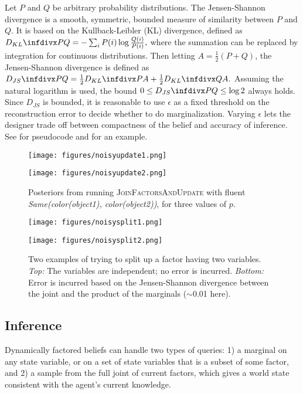 Let $P$ and $Q$ be arbitrary probability distributions. The
Jensen-Shannon divergence is a smooth, symmetric, bounded measure of
similarity between $P$ and $Q$. It is based on the Kullback-Leibler
(KL) divergence, defined as
$\kl{P}{Q} = -\sum_{i}P(i) \log \frac{Q(i)}{P(i)},$ where the
summation can be replaced by integration for continuous
distributions. Then letting $A = \frac{1}{2}(P+Q)$, the Jensen-Shannon
divergence is defined as
$\js{P}{Q} = \frac{1}{2} \kl{P}{A} + \frac{1}{2} \kl {Q}{A}.$ Assuming
the natural logarithm is used, the bound
$0 \leq \js{P}{Q} \leq \log 2$ always holds. Since $D_{JS}$ is
bounded, it is reasonable to use $\epsilon$ as a fixed threshold on
the reconstruction error to decide whether to do
marginalization. Varying $\epsilon$ lets the designer trade off
between compactness of the belief and accuracy of inference. See
 for pseudocode and  for
an example.

\begin{figure}[t]
  \vspace{0.6em}
  \centering
    \noindent
    \texttt{[image: figures/noisyupdate1.png]}

    \vspace{0.7em}

    \texttt{[image: figures/noisyupdate2.png]}
    \caption{Posteriors from running \textsc{JoinFactorsAndUpdate}
      with fluent \emph{Same(color(object1), color(object2))}, for
      three values of $p$.}
  \label{fig:joinfactorsandupdate}
\end{figure}

\begin{figure}[t]
  \centering
    \noindent
    \texttt{[image: figures/noisysplit1.png]}

    \vspace{0.7em}

    \texttt{[image: figures/noisysplit2.png]}
    \caption{Two examples of trying to split up a factor having two
      variables. \emph{Top:} The variables are independent; no error
      is incurred. \emph{Bottom:} Error is incurred based on the
      Jensen-Shannon divergence between the joint and the product of
      the marginals ($\sim$0.01 here).}
  \label{fig:trysplit}
\end{figure}

\subsection{Inference}
Dynamically factored beliefs can handle two types of queries: 1) a
marginal on any state variable, or on a set of state variables that is
a subset of some factor, and 2) a sample from the full joint of
current factors, which gives a world state consistent with the agent's
current knowledge.

